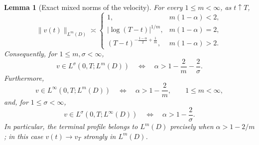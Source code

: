 \documentclass[10pt]{amsart}
\newtheorem{lemma}[theorem]{Lemma}
\theoremstyle{definition}
\begin{document}
\begin{lemma}[Exact mixed norms of the velocity]
\label{lem:velocity-mixed}
For every $1\leq m<\infty$, as $t\uparrow T$,
\begin{equation}
\label{eq:velocity-Lm-rate}
\|v(t)\|_{L^m(D)}
\asymp
\begin{cases}
1,
   &m(1-\alpha)<2,\\[1mm]
|\log(T-t)|^{1/m},
   &m(1-\alpha)=2,\\[1mm]
(T-t)^{-\frac{1-\alpha}{2}+\frac1m},
   &m(1-\alpha)>2.
\end{cases}
\end{equation}
Consequently, for $1\leq m,\sigma<\infty$,
\begin{equation}
\label{eq:velocity-mixed-iff}
    v\in L^\sigma(0,T;L^m(D))
    \quad\Longleftrightarrow\quad
    \alpha>1-\frac2m-\frac2\sigma.
\end{equation}
Furthermore,
\begin{equation}
\label{eq:velocity-time-endpoint}
    v\in L^\infty(0,T;L^m(D))
    \quad\Longleftrightarrow\quad
    \alpha>1-\frac2m,
    \qquad 1\leq m<\infty,
\end{equation}
and, for $1\leq\sigma<\infty$,
\begin{equation}
\label{eq:velocity-space-endpoint}
    v\in L^\sigma(0,T;L^\infty(D))
    \quad\Longleftrightarrow\quad
    \alpha>1-\frac2\sigma.
\end{equation}
In particular, the terminal profile belongs to $L^m(D)$ precisely when
$\alpha>1-2/m$; in this case $v(t)\to v_T$ strongly in $L^m(D)$.
\end{lemma}
\end{document}
